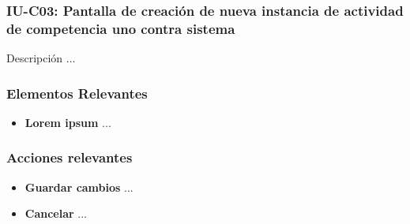
\subsubsection{IU-C03: Pantalla de creación de nueva instancia de actividad de competencia uno contra sistema}

 Descripción ...


\subsubsection{Elementos Relevantes}

    \begin{itemize}
    \item {\bf Lorem ipsum}
        ...
    \end{itemize}

\subsubsection{Acciones relevantes}

    \begin{itemize}
    \item {\bf Guardar cambios}
        ...

    \item {\bf Cancelar}
        ...
    \end{itemize}

\clearpage
